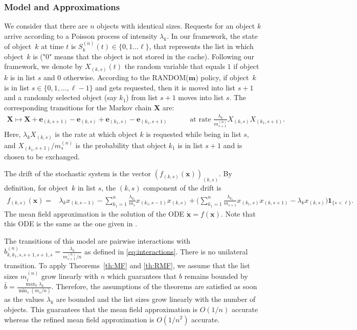 \documentclass[acmsmall]{acmart}
\newcommand\bx{\mathbf{x}}
\newcommand\be{\mathbf{e}}
\newcommand\bm{\mathbf{m}}
\newcommand\bX{\mathbf{X}}
\newcommand\toN{^{(n)}}
\newcommand\Sn{S\toN}
\begin{document}

\subsubsection{Model and Approximations}

We consider that there are $n$ objects with identical sizes. Requests for an object $k$ arrive according to a Poisson process of intensity $\lambda_k$. In our framework, the state of object~$k$ at time $t$ is $\Sn_k(t)\in\{0,1\dots \ell\}$, that represents the list in which  object~$k$ is ("0" means that the object is not stored in the cache). Following our framework, we denote by $X_{(k,s)}(t)$ the random variable that equals $1$ if object $k$ is in list $s$ and $0$ otherwise.  According to the RANDOM($\bm$) policy, if object~$k$ is in list $s\in \{0,1, \ldots, \ell-1\}$ and gets requested, then it is moved into list $s+1$ and a randomly selected object (say $k_1$) from list $s+1$ moves into list $s$.  The corresponding transitions for the Markov chain $\bX$ are: 
\begin{align}
  \bX \mapsto \bX + \be_{(k,s+1)} - \be_{(k,s)} + \be_{(k_1,s)} - \be_{(k_1,s+1)} & \qquad \text{ at rate } \frac{\lambda_k}{m_{s+1}\toN} X_{(k,s)}X_{(k_1,s+1)}. \label{eq:rand_m:transition}
\end{align}
Here, $\lambda_kX_{(k,s)}$ is the rate at which object $k$ is requested while being in list $s$, and $X_{(k_1,s+1)}/m_s\toN$ is the probability that object $k_1$ is in list $s+1$ and is chosen to be exchanged.

The drift of the stochastic system is the vector $(f_{(k,s)}(\bx))_{(k,s)}$. By definition, for object~$k$ in list $s$, the $(k,s)$ component of the drift is 
\begin{align*}
f_{(k,s)}(\bx) = & \lambda_k x_{(k,s-1)} - \sum_{k_1=1}^n\frac{\lambda_{k_1}}{m_s} x_{(k_1,s-1)}x_{(k,s)} + \bigl( \sum_{k_1=1}^n \frac{\lambda_{k_1}}{m_{s+1}} x_{(k_1,s)}x_{(k,s+1)} - \lambda_k x_{(k,s)} \bigr)\mathbf{1}_{\{s < \ell\}}.
\end{align*}
The mean field approximation is the solution of the ODE $\dot{\bx}=f(\bx)$. Note that this ODE is the same as the one given in \cite{gastTransientSteadystateRegime2015}.

The transitions of this model are pairwise interactions with $b\toN_{k,k_1,s,s+1,s+1,s} = \frac{\lambda_k}{m\toN_{s+1}/n}$ as defined in \eqref{eq:interactions}. There is no unilateral transition. To apply Theorems~\ref{th:MF} and \ref{th:RMF}, we assume that the list sizes $m_i\toN$ grow linearly with $n$ which guarantees that $b$ remains bounded by $\bar{b} = \frac{\max_k \lambda_k}{\min_s (m_s/n)}$. Therefore, the assumptions of the theorems are satisfied as soon as the values $\lambda_k$ are bounded and the list sizes grow linearly with the number of objects.  This guarantees that the mean field approximation is $O(1/n)$ accurate whereas the refined mean field approximation is $O(1/n^2)$ accurate. 
\end{document}
